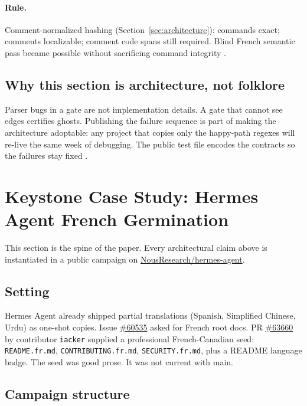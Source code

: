 \documentclass[11pt]{article}
\theoremstyle{definition}
\theoremstyle{plain}
\theoremstyle{remark}
\begin{document}
\paragraph{Rule.} Comment-normalized hashing (Section~\ref{sec:architecture}):
commands exact; comments localizable; comment code spans still required.
Blind French semantic pass became possible without sacrificing command
integrity \citep{hermespr80391}.

\subsection{Why this section is architecture, not folklore}

Parser bugs in a gate are not implementation details. A gate that cannot see
edges certifies ghosts. Publishing the failure sequence is part of making the
architecture adoptable: any project that copies only the happy-path regexes
will re-live the same week of debugging. The public test file encodes the
contracts so the failures stay fixed
\citep{hermespr80391}.


\section{Keystone Case Study: Hermes Agent French Germination}
\label{sec:casestudy}

This section is the spine of the paper. Every architectural claim above is
instantiated in a public campaign on
\href{https://github.com/NousResearch/hermes-agent}{NousResearch/hermes-agent}.

\subsection{Setting}

Hermes Agent already shipped partial translations (Spanish, Simplified
Chinese, Urdu) as one-shot copies. Issue
\href{https://github.com/NousResearch/hermes-agent/issues/60535}{\#60535}
asked for French root docs. PR
\href{https://github.com/NousResearch/hermes-agent/pull/63660}{\#63660} by
contributor \texttt{iacker} supplied a professional French-Canadian seed:
\texttt{README.fr.md}, \texttt{CONTRIBUTING.fr.md}, \texttt{SECURITY.fr.md},
plus a README language badge. The seed was good prose. It was not current
with main.

\subsection{Campaign structure}
\end{document}
